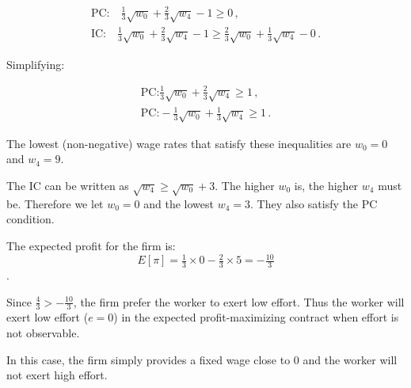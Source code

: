 \documentclass{article}
\begin{document}
\begin{gather*}
 \text{PC:} \quad \tfrac13\sqrt{w_0} + \tfrac23\sqrt{w_4} - 1 \geq 0  \, ,\\
 \text{IC:} \quad   \tfrac13\sqrt{w_0} + \tfrac23\sqrt{w_4} - 1 \geq \tfrac23\sqrt{w_0} + \tfrac13\sqrt{w_4} -0 \, .
\end{gather*}

Simplifying:

\begin{gather*}
 \text{PC:}   \tfrac13 \sqrt{w_0} + \tfrac23 \sqrt{w_4} \geq 1  \, ,\\
 \text{PC:}    -\tfrac13 \sqrt{w_0} + \tfrac13 \sqrt{w_4} \geq 1  \, .
\end{gather*}

The lowest (non-negative) wage rates that satisfy these inequalities are $w_0 = 0$ and $w_4 = 9$.

\begin{mdframed}[backgroundcolor=blue!20,linecolor=white]
The IC can be written as $\sqrt{w_4} \geq  \sqrt{w_0} + 3$. The higher $w_0$ is, the higher $w_4$ must be. Therefore we let $w_0=0$ and the lowest $w_4=3$. They also satisfy the PC condition.
\end{mdframed}

The expected profit for the firm is: $$ E[\pi]=\tfrac13 \times 0 - \tfrac23 \times 5 = - \tfrac{10}3$$.

Since $\tfrac43 > - \tfrac{10}3$, the firm prefer the worker to exert low effort. Thus the worker will exert low effort ($e=0$) in the expected profit-maximizing contract when effort is not observable.

\begin{mdframed}[backgroundcolor=blue!20,linecolor=white]
In this case, the firm simply provides a fixed wage close to 0 and the worker will not exert high effort.
\end{mdframed}
\end{document}
